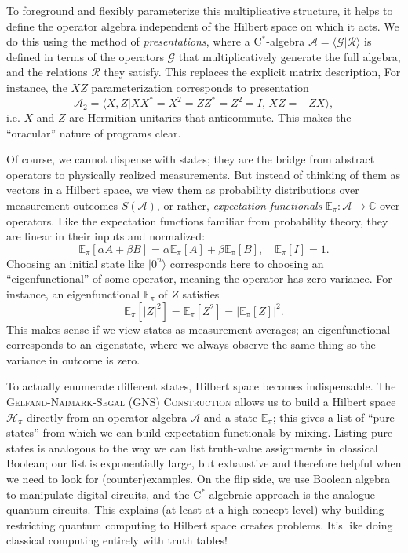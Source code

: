To foreground and flexibly parameterize this multiplicative structure,
it helps to define the operator algebra independent of the Hilbert
space on which it acts. We do this using the method of
\emph{presentations}, where a C${}^*$-algebra $\mathcal{A} = \langle\mathcal{G}|\mathcal{R}\rangle$ is defined
in terms of the operators $\mathcal{G}$ that multiplicatively generate the full
algebra, and the relations $\mathcal{R}$ they satisfy. This replaces the explicit
matrix description, For instance, the $XZ$ parameterization corresponds to presentation
\[
  \mathcal{A}_2 = \langle X, Z | XX^* = X^2 = ZZ^* = Z^2 = I, \, XZ
  = -ZX\rangle,
\]
i.e. $X$ and $Z$ are Hermitian unitaries that anticommute.
This makes the ``oracular'' nature of programs clear.

Of course, we cannot dispense with states; they are the bridge from
abstract operators to physically realized measurements. %
But instead of
thinking of them as vectors in a Hilbert space, we view them as
probability distributions over measurement outcomes $S(\mathcal{A})$, or rather,
\emph{expectation functionals} $\mathbb{E}_\pi:
\mathcal{A}\to\mathbb{C}$ over operators.
Like the expectation functions familiar from probability theory, they
are linear in their inputs and normalized:
\[
\mathbb{E}_\pi[\alpha A + \beta B] = \alpha\mathbb{E}_\pi[A] + \beta\mathbb{E}_\pi[B], \quad  \mathbb{E}_\pi[I] = 1.
\]
Choosing an initial state like $|0^n\rangle$ corresponds here to choosing an ``eigenfunctional'' of some operator, meaning
the operator has zero variance. For instance, an
eigenfunctional $\mathbb{E}_\pi$ of $Z$ satisfies
\[
  \mathbb{E}_\pi[|Z|^2] =  \mathbb{E}_\pi[Z^2] =   \left|\mathbb{E}_\pi[Z]\right|^2.
\]
This makes sense if we view states as measurement averages; an eigenfunctional corresponds to an eigenstate,
where we always observe the same thing so the variance in outcome is
zero.

To actually enumerate different states, Hilbert space becomes
indispensable.
The \textsc{Gelfand-Naimark-Segal (GNS) Construction} allows us to
build a Hilbert space $\mathcal{H}_\pi$ directly from an operator algebra $\mathcal{A}$
and a state $\mathbb{E}_\pi$; this gives a list of ``pure states''
from which we can build expectation functionals by mixing.
Listing pure states is analogous to the way we can list
truth-value assignments in classical Boolean; our list is
exponentially large, but exhaustive and therefore helpful
when we need to look for (counter)examples. On the flip side, we use Boolean algebra to manipulate digital
circuits, and the C${}^*$-algebraic approach is the analogue quantum circuits.
This explains (at least at a high-concept level) why building
restricting quantum computing to Hilbert space creates problems.
It's like doing classical computing entirely with truth tables!

